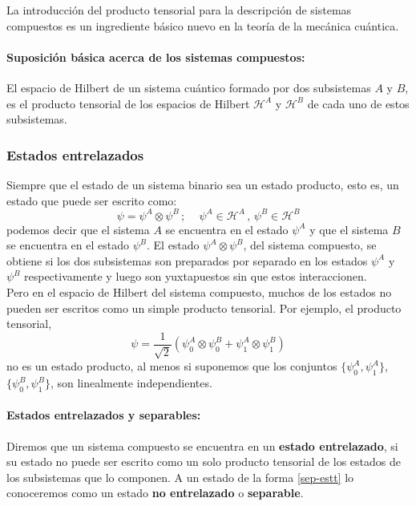 \documentclass[12pt]{book}
\numberwithin{equation}{chapter}
\def\H{\mathcal{H}}
\begin{document}
La introducci\'on del producto tensorial para la descripci\'on de sistemas compuestos es un ingrediente b\'asico nuevo en la teor\'ia de la mec\'anica cu\'antica.

\paragraph{Suposici\'on b\'asica acerca de los sistemas compuestos:}
El espacio de Hilbert de un sistema cu\'antico formado por dos subsistemas $A$ y $B$, es el producto tensorial de los espacios de Hilbert $\H^{A}$ y $\H^{B}$ de cada uno de estos subsistemas.\\
\rightline{$\dag$}

\subsubsection{Estados entrelazados}
Siempre que el estado de un sistema binario sea un estado producto, esto es, un estado que puede ser escrito como:
\begin{equation}\label{sep-estt}
\psi= \psi^{A} \otimes \psi^{B} \,;\,\,\,\,\,\,\, \psi^{A} \in \H^{A} \,,\, \psi^{B} \in \H^{B}
\end{equation}
podemos decir que el sistema $A$ se encuentra en el estado $\psi^{A}$ y que el sistema $B$ se encuentra en el estado $\psi^{B}$. El estado $\psi^{A} \otimes \psi^{B}$, del sistema compuesto, se obtiene si los dos subsistemas son preparados por separado en los estados $\psi^{A}$ y $\psi^{B}$ respectivamente y luego son yuxtapuestos sin que estos interaccionen.\\ 
Pero en el espacio de Hilbert del sistema compuesto, muchos de los estados no pueden ser escritos como un simple producto tensorial. Por ejemplo, el producto tensorial,
$$ \psi = \frac{1}{\sqrt{2}} ( \psi_{0}^{A} \otimes \psi_{0}^{B} + \psi_{1}^{A} \otimes \psi_{1}^{B} ) $$
no es un estado producto, al menos si suponemos que los conjuntos $\{ \psi_{0}^{A} , \psi_{1}^{A} \}$, $\{ \psi_{0}^{B} , \psi_{1}^{B} \}$, son linealmente independientes. 

\paragraph{Estados entrelazados y separables:} 
Diremos que un sistema compuesto se encuentra en un {\bf estado entrelazado},
si su estado no puede ser escrito como un solo producto tensorial de los estados de los subsistemas que lo componen. A un estado de la forma \eqref{sep-estt} lo conoceremos como un estado {\bf no entrelazado} o {\bf separable}.
\end{document}
